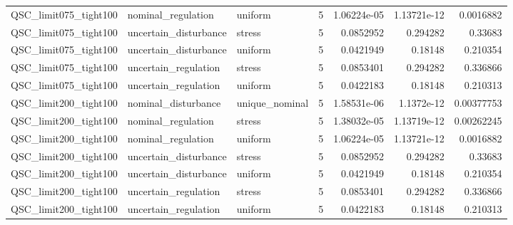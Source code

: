 \begin{tabular}{llllrrr}
QSC\_limit075\_tight100 & nominal\_regulation & uniform & 5 & 1.06224e-05 & 1.13721e-12 & 0.0016882 \\
QSC\_limit075\_tight100 & uncertain\_disturbance & stress & 5 & 0.0852952 & 0.294282 & 0.33683 \\
QSC\_limit075\_tight100 & uncertain\_disturbance & uniform & 5 & 0.0421949 & 0.18148 & 0.210354 \\
QSC\_limit075\_tight100 & uncertain\_regulation & stress & 5 & 0.0853401 & 0.294282 & 0.336866 \\
QSC\_limit075\_tight100 & uncertain\_regulation & uniform & 5 & 0.0422183 & 0.18148 & 0.210313 \\
QSC\_limit200\_tight100 & nominal\_disturbance & unique\_nominal & 5 & 1.58531e-06 & 1.1372e-12 & 0.00377753 \\
QSC\_limit200\_tight100 & nominal\_regulation & stress & 5 & 1.38032e-05 & 1.13719e-12 & 0.00262245 \\
QSC\_limit200\_tight100 & nominal\_regulation & uniform & 5 & 1.06224e-05 & 1.13721e-12 & 0.0016882 \\
QSC\_limit200\_tight100 & uncertain\_disturbance & stress & 5 & 0.0852952 & 0.294282 & 0.33683 \\
QSC\_limit200\_tight100 & uncertain\_disturbance & uniform & 5 & 0.0421949 & 0.18148 & 0.210354 \\
QSC\_limit200\_tight100 & uncertain\_regulation & stress & 5 & 0.0853401 & 0.294282 & 0.336866 \\
QSC\_limit200\_tight100 & uncertain\_regulation & uniform & 5 & 0.0422183 & 0.18148 & 0.210313 \\
\hline
\end{tabular}
